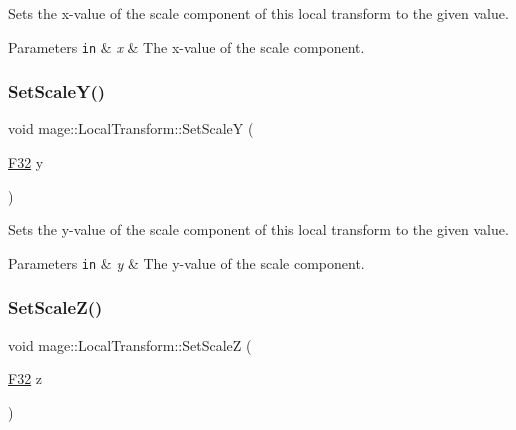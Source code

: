 Sets the x-\/value of the scale component of this local transform to the given value.


\begin{DoxyParams}[1]{Parameters}
\mbox{\tt in}  & {\em x} & The x-\/value of the scale component. \\
\hline
\end{DoxyParams}
\hypertarget{classmage_1_1_local_transform_a17297480169c047f0a08c2022b69fc42}{}\label{classmage_1_1_local_transform_a17297480169c047f0a08c2022b69fc42} 
\subsubsection{\texorpdfstring{Set\+Scale\+Y()}{SetScaleY()}}
{\footnotesize\ttfamily void mage\+::\+Local\+Transform\+::\+Set\+ScaleY (\begin{DoxyParamCaption}\item[{\hyperlink{namespacemage_aa97e833b45f06d60a0a9c4fc22ae02c0}{F32}}]{y }\end{DoxyParamCaption})\hspace{0.3cm}{\ttfamily [noexcept]}}

Sets the y-\/value of the scale component of this local transform to the given value.


\begin{DoxyParams}[1]{Parameters}
\mbox{\tt in}  & {\em y} & The y-\/value of the scale component. \\
\hline
\end{DoxyParams}
\hypertarget{classmage_1_1_local_transform_a076673ed934cc2b92febfd5477e81e75}{}\label{classmage_1_1_local_transform_a076673ed934cc2b92febfd5477e81e75} 
\subsubsection{\texorpdfstring{Set\+Scale\+Z()}{SetScaleZ()}}
{\footnotesize\ttfamily void mage\+::\+Local\+Transform\+::\+Set\+ScaleZ (\begin{DoxyParamCaption}\item[{\hyperlink{namespacemage_aa97e833b45f06d60a0a9c4fc22ae02c0}{F32}}]{z }\end{DoxyParamCaption})\hspace{0.3cm}{\ttfamily [noexcept]}}

